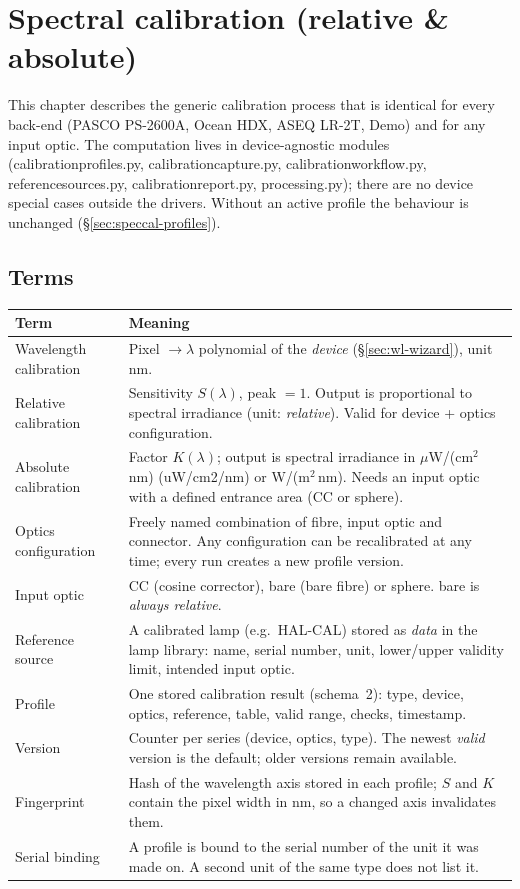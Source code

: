 \documentclass[12pt,a4paper]{article}
\DeclareRobustCommand{\code}[1]{{\ttfamily\small\def\_{\rawus\allowbreak}#1}}
\DeclareRobustCommand{\file}[1]{{\ttfamily\small\def\_{\rawus\allowbreak}#1}}
\begin{document}
\section{Spectral calibration (relative \& absolute)}\label{sec:speccal}
This chapter describes the generic calibration process that is identical for
every back-end (PASCO PS-2600A, Ocean HDX, ASEQ LR-2T, Demo) and for any input
optic. The computation lives in device-agnostic modules
(\file{calibration\_profiles.py}, \file{calibration\_capture.py},
\file{calibration\_workflow.py}, \file{reference\_sources.py},
\file{calibration\_report.py}, \file{processing.py}); there are no device
special cases outside the drivers. Without an active profile the behaviour is
unchanged (\S\ref{sec:speccal-profiles}).

\subsection{Terms}
\begin{longtable}{@{}p{3.6cm}p{10.6cm}@{}}
\toprule \textbf{Term} & \textbf{Meaning}\\ \midrule\endhead
Wavelength calibration & Pixel $\to\lambda$ polynomial of the \emph{device}
  (\S\ref{sec:wl-wizard}), unit nm.\\
Relative calibration & Sensitivity $S(\lambda)$, peak $=1$. Output is
  proportional to spectral irradiance (unit: \emph{relative}). Valid for device
  + optics configuration.\\
Absolute calibration & Factor $K(\lambda)$; output is spectral irradiance in
  $\mu$W/(cm$^2$\,nm) (\code{uW/cm2/nm}) or W/(m$^2$\,nm). Needs
  an input optic with a defined entrance area (CC or sphere).\\
Optics configuration & Freely named combination of fibre, input optic and
  connector. Any configuration can be recalibrated at any time; every run
  creates a new profile version.\\
Input optic & \code{CC} (cosine corrector), \code{bare} (bare fibre) or
  \code{sphere}. \code{bare} is \emph{always relative}.\\
Reference source & A calibrated lamp (e.g.\ HAL-CAL) stored as \emph{data} in the
  lamp library: name, serial number, unit, lower/upper validity limit,
  intended input optic.\\
Profile & One stored calibration result (schema~2): type, device, optics,
  reference, table, valid range, checks, timestamp.\\
Version & Counter per series (device, optics, type). The newest \emph{valid}
  version is the default; older versions remain available.\\
Fingerprint & Hash of the wavelength axis stored in each profile; $S$ and $K$
  contain the pixel width in nm, so a changed axis invalidates them.\\
Serial binding & A profile is bound to the serial number of the unit it was
  made on. A second unit of the same type does not list it.\\
\bottomrule
\end{longtable}
\end{document}
